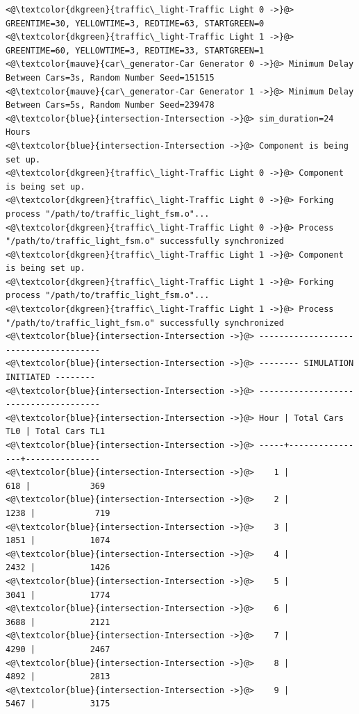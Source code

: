 \documentclass{article}
\begin{document}
\begin{lstlisting}[caption={Sample Simulation Output}, captionpos=b]
<@\textcolor{dkgreen}{traffic\_light-Traffic Light 0 ->}@> GREENTIME=30, YELLOWTIME=3, REDTIME=63, STARTGREEN=0
<@\textcolor{dkgreen}{traffic\_light-Traffic Light 1 ->}@> GREENTIME=60, YELLOWTIME=3, REDTIME=33, STARTGREEN=1
<@\textcolor{mauve}{car\_generator-Car Generator 0 ->}@> Minimum Delay Between Cars=3s, Random Number Seed=151515
<@\textcolor{mauve}{car\_generator-Car Generator 1 ->}@> Minimum Delay Between Cars=5s, Random Number Seed=239478
<@\textcolor{blue}{intersection-Intersection ->}@> sim_duration=24 Hours
<@\textcolor{blue}{intersection-Intersection ->}@> Component is being set up.
<@\textcolor{dkgreen}{traffic\_light-Traffic Light 0 ->}@> Component is being set up.
<@\textcolor{dkgreen}{traffic\_light-Traffic Light 0 ->}@> Forking process "/path/to/traffic_light_fsm.o"...
<@\textcolor{dkgreen}{traffic\_light-Traffic Light 0 ->}@> Process "/path/to/traffic_light_fsm.o" successfully synchronized
<@\textcolor{dkgreen}{traffic\_light-Traffic Light 1 ->}@> Component is being set up.
<@\textcolor{dkgreen}{traffic\_light-Traffic Light 1 ->}@> Forking process "/path/to/traffic_light_fsm.o"...
<@\textcolor{dkgreen}{traffic\_light-Traffic Light 1 ->}@> Process "/path/to/traffic_light_fsm.o" successfully synchronized
<@\textcolor{blue}{intersection-Intersection ->}@> --------------------------------------
<@\textcolor{blue}{intersection-Intersection ->}@> -------- SIMULATION INITIATED --------
<@\textcolor{blue}{intersection-Intersection ->}@> --------------------------------------
<@\textcolor{blue}{intersection-Intersection ->}@> Hour | Total Cars TL0 | Total Cars TL1
<@\textcolor{blue}{intersection-Intersection ->}@> -----+----------------+---------------
<@\textcolor{blue}{intersection-Intersection ->}@>    1 |              618 |            369
<@\textcolor{blue}{intersection-Intersection ->}@>    2 |             1238 |            719
<@\textcolor{blue}{intersection-Intersection ->}@>    3 |             1851 |           1074
<@\textcolor{blue}{intersection-Intersection ->}@>    4 |             2432 |           1426
<@\textcolor{blue}{intersection-Intersection ->}@>    5 |             3041 |           1774
<@\textcolor{blue}{intersection-Intersection ->}@>    6 |             3688 |           2121
<@\textcolor{blue}{intersection-Intersection ->}@>    7 |             4290 |           2467
<@\textcolor{blue}{intersection-Intersection ->}@>    8 |             4892 |           2813
<@\textcolor{blue}{intersection-Intersection ->}@>    9 |             5467 |           3175

\end{lstlisting}
\end{document}
